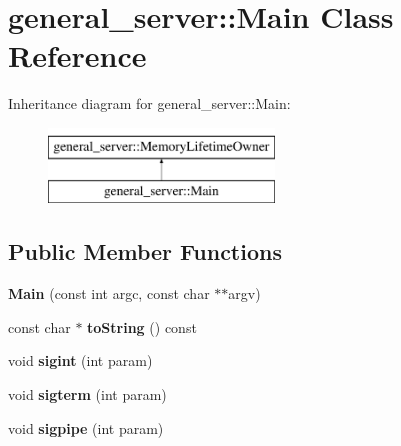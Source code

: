 \hypertarget{classgeneral__server_1_1Main}{\section{general\-\_\-server\-:\-:\-Main \-Class \-Reference}
\label{classgeneral__server_1_1Main}
}
\-Inheritance diagram for general\-\_\-server\-:\-:\-Main\-:\begin{figure}[H]
\begin{center}
\leavevmode
\includegraphics[height=2.000000cm]{classgeneral__server_1_1Main}
\end{center}
\end{figure}
\subsection*{\-Public \-Member \-Functions}
\begin{DoxyCompactItemize}
\item 
\hypertarget{classgeneral__server_1_1Main_a7dcc7bb8f1dcc0ac8dc8388ac1bd10dc}{{\bfseries \-Main} (const int argc, const char $\ast$$\ast$argv)}\label{classgeneral__server_1_1Main_a7dcc7bb8f1dcc0ac8dc8388ac1bd10dc}

\item 
\hypertarget{classgeneral__server_1_1Main_a7a93c81939d820352f80ace659f514eb}{const char $\ast$ {\bfseries to\-String} () const }\label{classgeneral__server_1_1Main_a7a93c81939d820352f80ace659f514eb}

\item 
\hypertarget{classgeneral__server_1_1Main_a2bea45bb2c3f7f96dae2aaf012feb6a2}{void {\bfseries sigint} (int param)}\label{classgeneral__server_1_1Main_a2bea45bb2c3f7f96dae2aaf012feb6a2}

\item 
\hypertarget{classgeneral__server_1_1Main_abd87c0e314bb8ef924e06600e73b3d9e}{void {\bfseries sigterm} (int param)}\label{classgeneral__server_1_1Main_abd87c0e314bb8ef924e06600e73b3d9e}

\item 
\hypertarget{classgeneral__server_1_1Main_a64f502c14eb7f641b376f49234f629a8}{void {\bfseries sigpipe} (int param)}\label{classgeneral__server_1_1Main_a64f502c14eb7f641b376f49234f629a8}

\end{DoxyCompactItemize}
